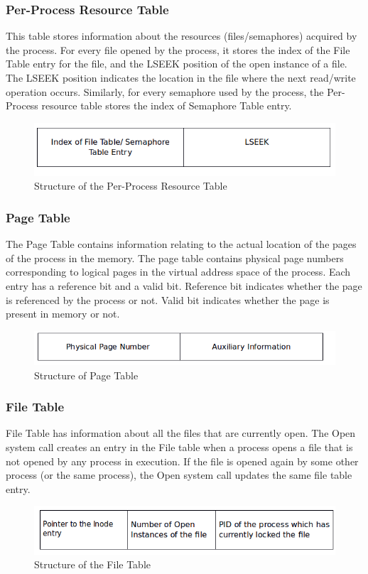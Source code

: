 \documentclass[11pt ,twosided]{article}
\begin{document}
\subsubsection{Per-Process Resource Table}
This table stores information about the resources (files/semaphores) acquired by the process. For every file opened by the process, it stores the index of the File Table entry for the file, and the LSEEK position of the open instance of a file. The LSEEK position indicates the location in the file where the next read/write operation occurs. Similarly, for every semaphore used by the process, the Per-Process resource table stores the index of Semaphore Table entry. 
\begin{figure}[ht]
\centering
\includegraphics[scale=0.60]{PerProcessResource_table.png}
\caption{\footnotesize Structure of the Per-Process Resource Table}
\label{fig_3}
\end{figure}

\subsubsection{Page Table}
The Page Table contains information relating to the actual location of the pages of the process in the memory. The page table contains physical page numbers corresponding to logical pages in the virtual address space of the process. Each entry has a reference bit and a valid bit. Reference bit indicates whether the page is referenced by the process or not. Valid bit indicates whether the page is present in memory or not.
\begin{figure}[ht]
\centering
\includegraphics[scale=0.60]{Page_table.png}
\caption{\footnotesize Structure of Page Table}
\label{fig_4}
\end{figure}
\subsubsection{File Table}

File Table has information about all the files that are currently open.  The Open system call creates an entry in the File table when a process opens a file that is not opened by any process in execution. If the file is opened again by some other process (or the same process), the Open system call updates the same file table entry.
\begin{figure}[ht]
\centering
\includegraphics[scale=0.60]{File_table.png}
\caption{\footnotesize Structure of the File Table}
\label{fig_5}
\end{figure}
\end{document}
